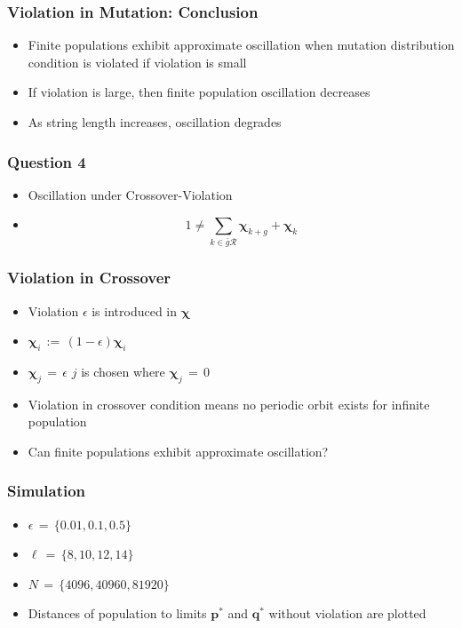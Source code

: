 \documentclass[aspectratio=169]{beamer}
\begin{document}
  
  \begin{frame}
    \frametitle{Violation in Mutation: Conclusion}
    \begin{itemize}      
      \item{Finite populations exhibit approximate oscillation when mutation distribution condition is violated if violation is small}
      \item{If violation is large, then finite population oscillation decreases}
      \item{As string length increases, oscillation degrades}
    \end{itemize}
  \end{frame}
  
   \begin{frame}
    \frametitle{Question 4}
    \begin{itemize}
      \item{Oscillation under Crossover-Violation}      
      \item
      \[	
	1 \neq \sum \limits_{k \in \bar{g}\mathcal{R}} \bm{\chi}_{k+g} + \bm{\chi}_k 
      \]
    \end{itemize}
  \end{frame}
  
  \begin{frame}
    \frametitle{Violation in Crossover}
    \begin{itemize}
      \item{Violation $\epsilon$ is introduced in $\bm{\chi}$ }
      \item{$\bm{\chi}_i \,:=\, (1 - \epsilon) \bm{\chi}_i$}
      \item{$\bm{\chi}_j \,=\, \epsilon$  \hspace{1cm}  $j$ is chosen where $\bm{\chi}_j \,=\, 0$}
      \item{Violation in crossover condition means no periodic orbit exists for infinite population}
      \item{Can finite populations exhibit approximate oscillation?}
    \end{itemize}
  \end{frame}
  
  \begin{frame}
    \frametitle{Simulation}
    \begin{itemize}
      \item{$\epsilon \,=\, \{0.01, 0.1, 0.5\}$}      
      \item{$\ell \,=\, \{8,10,12,14\}$}
      \item{$N \,=\, \{4096, 40960, 81920\}$}
      \item{Distances of population to limits $\bm{p}^\ast$ and $\bm{q}^\ast$ without violation are plotted }
    \end{itemize}
  \end{frame}
  
\end{document}
